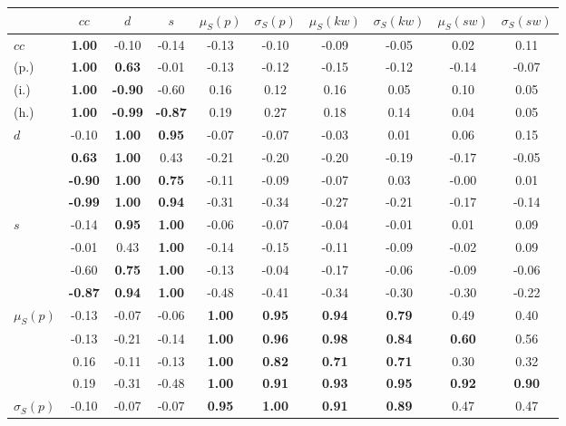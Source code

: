 \begin{table*}[h!]
\begin{center}
\begin{tabular}{| l || c | c | c | c | c | c | c | c | c |}\hline
 & $cc$ & $d$ & $s$ & $\mu_S(p)$ & $\sigma_S(p)$ & $\mu_S(kw)$ & $\sigma_S(kw)$ & $\mu_S(sw)$ & $\sigma_S(sw)$ \\\hline\hline
$cc$ & {\bf 1.00} & -0.10 & -0.14 & -0.13 & -0.10 & -0.09 & -0.05 & 0.02 & 0.11 \\
(p.) & {\bf 1.00} & {\bf 0.63} & -0.01 & -0.13 & -0.12 & -0.15 & -0.12 & -0.14 & -0.07 \\
(i.) & {\bf 1.00} & {\bf -0.90} & -0.60 & 0.16 & 0.12 & 0.16 & 0.05 & 0.10 & 0.05 \\
(h.) & {\bf 1.00} & {\bf -0.99} & {\bf -0.87} & 0.19 & 0.27 & 0.18 & 0.14 & 0.04 & 0.05 \\\hline
$d$ & -0.10 & {\bf 1.00} & {\bf 0.95} & -0.07 & -0.07 & -0.03 & 0.01 & 0.06 & 0.15 \\
 & {\bf 0.63} & {\bf 1.00} & 0.43 & -0.21 & -0.20 & -0.20 & -0.19 & -0.17 & -0.05 \\
 & {\bf -0.90} & {\bf 1.00} & {\bf 0.75} & -0.11 & -0.09 & -0.07 & 0.03 & -0.00 & 0.01 \\
 & {\bf -0.99} & {\bf 1.00} & {\bf 0.94} & -0.31 & -0.34 & -0.27 & -0.21 & -0.17 & -0.14 \\\hline
$s$ & -0.14 & {\bf 0.95} & {\bf 1.00} & -0.06 & -0.07 & -0.04 & -0.01 & 0.01 & 0.09 \\
 & -0.01 & 0.43 & {\bf 1.00} & -0.14 & -0.15 & -0.11 & -0.09 & -0.02 & 0.09 \\
 & -0.60 & {\bf 0.75} & {\bf 1.00} & -0.13 & -0.04 & -0.17 & -0.06 & -0.09 & -0.06 \\
 & {\bf -0.87} & {\bf 0.94} & {\bf 1.00} & -0.48 & -0.41 & -0.34 & -0.30 & -0.30 & -0.22 \\\hline
$\mu_S(p)$ & -0.13 & -0.07 & -0.06 & {\bf 1.00} & {\bf 0.95} & {\bf 0.94} & {\bf 0.79} & 0.49 & 0.40 \\
 & -0.13 & -0.21 & -0.14 & {\bf 1.00} & {\bf 0.96} & {\bf 0.98} & {\bf 0.84} & {\bf 0.60} & 0.56 \\
 & 0.16 & -0.11 & -0.13 & {\bf 1.00} & {\bf 0.82} & {\bf 0.71} & {\bf 0.71} & 0.30 & 0.32 \\
 & 0.19 & -0.31 & -0.48 & {\bf 1.00} & {\bf 0.91} & {\bf 0.93} & {\bf 0.95} & {\bf 0.92} & {\bf 0.90} \\\hline
$\sigma_S(p)$ & -0.10 & -0.07 & -0.07 & {\bf 0.95} & {\bf 1.00} & {\bf 0.91} & {\bf 0.89} & 0.47 & 0.47 \\

\end{tabular}
\end{center}
\end{table*}
